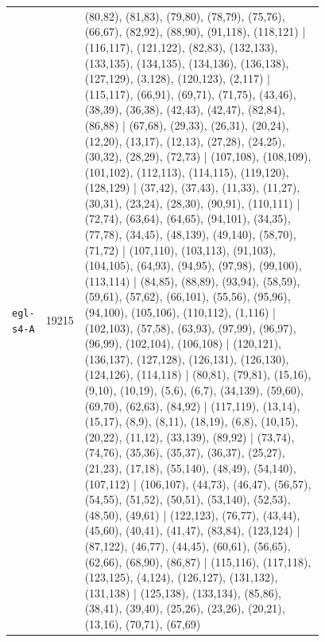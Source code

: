 \begin{landscape}
\begin{longtable}{lr>{\tiny\raggedright\arraybackslash}p{0.78\linewidth}}
\texttt{egl-s4-A} & 19215 & (80,82), (81,83), (79,80), (78,79), (75,76), (66,67), (82,92), (88,90), (91,118), (118,121) | (116,117), (121,122), (82,83), (132,133), (133,135), (134,135), (134,136), (136,138), (127,129), (3,128), (120,123), (2,117) | (115,117), (66,91), (69,71), (71,75), (43,46), (38,39), (36,38), (42,43), (42,47), (82,84), (86,88) | (67,68), (29,33), (26,31), (20,24), (12,20), (13,17), (12,13), (27,28), (24,25), (30,32), (28,29), (72,73) | (107,108), (108,109), (101,102), (112,113), (114,115), (119,120), (128,129) | (37,42), (37,43), (11,33), (11,27), (30,31), (23,24), (28,30), (90,91), (110,111) | (72,74), (63,64), (64,65), (94,101), (34,35), (77,78), (34,45), (48,139), (49,140), (58,70), (71,72) | (107,110), (103,113), (91,103), (104,105), (64,93), (94,95), (97,98), (99,100), (113,114) | (84,85), (88,89), (93,94), (58,59), (59,61), (57,62), (66,101), (55,56), (95,96), (94,100), (105,106), (110,112), (1,116) | (102,103), (57,58), (63,93), (97,99), (96,97), (96,99), (102,104), (106,108) | (120,121), (136,137), (127,128), (126,131), (126,130), (124,126), (114,118) | (80,81), (79,81), (15,16), (9,10), (10,19), (5,6), (6,7), (34,139), (59,60), (69,70), (62,63), (84,92) | (117,119), (13,14), (15,17), (8,9), (8,11), (18,19), (6,8), (10,15), (20,22), (11,12), (33,139), (89,92) | (73,74), (74,76), (35,36), (35,37), (36,37), (25,27), (21,23), (17,18), (55,140), (48,49), (54,140), (107,112) | (106,107), (44,73), (46,47), (56,57), (54,55), (51,52), (50,51), (53,140), (52,53), (48,50), (49,61) | (122,123), (76,77), (43,44), (45,60), (40,41), (41,47), (83,84), (123,124) | (87,122), (46,77), (44,45), (60,61), (56,65), (62,66), (68,90), (86,87) | (115,116), (117,118), (123,125), (4,124), (126,127), (131,132), (131,138) | (125,138), (133,134), (85,86), (38,41), (39,40), (25,26), (23,26), (20,21), (13,16), (70,71), (67,69) \\[2pt]

\end{longtable}
\end{landscape}
